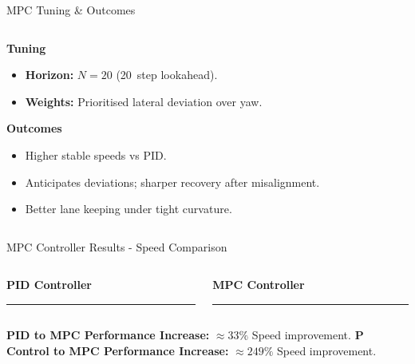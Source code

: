 \documentclass[aspectratio=169,12pt]{beamer}
\begin{document}
\begin{frame}[t]{MPC Tuning \& Outcomes}
  \vspace*{-0.3em}
  \begin{columns}[T]
    \begin{column}{0.52\textwidth}
      \textbf{Tuning}
      \begin{itemize}\setlength{\itemsep}{0.35em}
        \item \textbf{Horizon:} \(N=20\) (20\, step lookahead).
        \item \textbf{Weights:} Prioritised lateral deviation over yaw.
      \end{itemize}
      \vspace{0.6em}
      \textbf{Outcomes}
      \begin{itemize}\setlength{\itemsep}{0.35em}
        \item Higher stable speeds vs PID.
        \item Anticipates deviations; sharper recovery after misalignment.
        \item Better lane keeping under tight curvature.
      \end{itemize}
    \end{column}
    \begin{column}{0.48\textwidth}
      \centering

    \end{column}
  \end{columns}
\end{frame}

\begin{frame}[t]{MPC Controller Results - Speed Comparison}
  \begin{columns}[T]
    \begin{column}{0.5\textwidth}
      \centering
      \textbf{PID Controller} \\
      \vspace{0.3em}
      \rule{0pt}{5cm}\rule{0.9\linewidth}{0pt} %
    \end{column}

    \begin{column}{0.5\textwidth}
      \centering
      \textbf{MPC Controller} \\
      \vspace{0.3em}
      \rule{0pt}{5cm}\rule{0.9\linewidth}{0pt} %
    \end{column}
  \end{columns}

  \vspace{0.6em}
  \centering
  \textbf{PID to MPC Performance Increase:} \(\approx 33  \%\) Speed improvement. \newline
  \textbf{P Control to MPC Performance Increase:} \(\approx 249  \%\) Speed improvement.
\end{frame}
\end{document}
